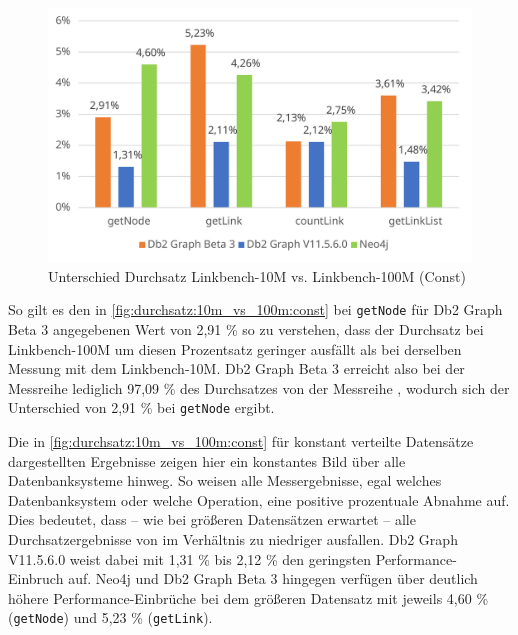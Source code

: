 \begin{figure}[!ht]
    \centering
    \includegraphics[width=\textwidth]{images/diagramme/difference_durchsatz_const_10m_vs_100m.pdf}
    \caption{Unterschied Durchsatz Linkbench-10M vs. Linkbench-100M (Const)}
    \label{fig:durchsatz:10m_vs_100m:const}
\end{figure}

So gilt es den in \autoref{fig:durchsatz:10m_vs_100m:const} bei \texttt{getNode} für Db2 Graph Beta 3 angegebenen Wert von 2,91 \% so zu verstehen, dass der Durchsatz bei Linkbench-100M um diesen Prozentsatz geringer ausfällt als bei derselben Messung mit dem Linkbench-10M. Db2 Graph Beta 3 erreicht also bei der Messreihe  lediglich 97,09 \% des Durchsatzes von der Messreihe , wodurch sich der Unterschied von 2,91 \% bei \texttt{getNode} ergibt.

Die in \autoref{fig:durchsatz:10m_vs_100m:const} für konstant verteilte Datensätze dargestellten Ergebnisse zeigen hier ein konstantes Bild über alle Datenbanksysteme hinweg. So weisen alle Messergebnisse, egal welches Datenbanksystem oder welche Operation, eine positive prozentuale Abnahme auf. Dies bedeutet, dass -- wie bei größeren Datensätzen erwartet -- alle Durchsatzergebnisse von  im Verhältnis zu  niedriger ausfallen. Db2 Graph V11.5.6.0 weist dabei mit 1,31 \% bis 2,12 \% den geringsten Performance-Einbruch auf. Neo4j und Db2 Graph Beta 3 hingegen verfügen über deutlich höhere Performance-Einbrüche bei dem größeren Datensatz mit jeweils 4,60 \% (\texttt{getNode}) und 5,23 \% (\texttt{getLink}). 

